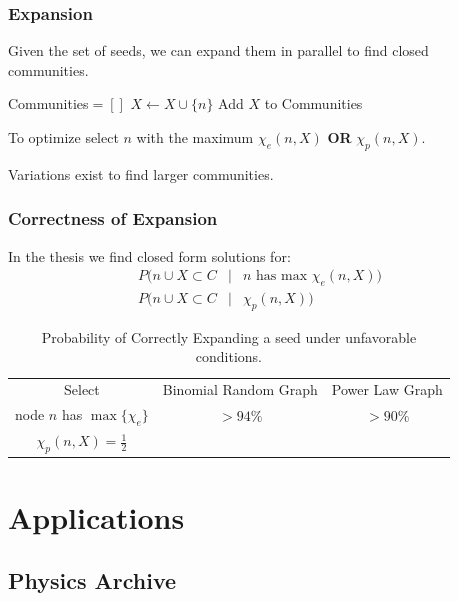\documentclass{beamer}
\begin{document}
\begin{frame}\frametitle{Expansion}

Given the set of seeds, we can expand them in parallel to find closed communities. \newline 

\begin{algorithmic}
	\STATE Communities$=[]$
			\STATE $X \leftarrow X \cup \{n\}$
		\ENDWHILE
	\STATE Add $X$ to Communities
	\ENDFOR
\end{algorithmic}
To optimize select $n$ with the maximum $\chi_e(n, X)$ {\bf OR} $\chi_p(n, X)$.

Variations exist to find larger communities.  

\end{frame}


\begin{frame}\frametitle{Correctness of Expansion}
In the thesis we find closed form solutions for:
\begin{eqnarray*}
 P(n \cup X \subset C &|& n \mbox{ has max } \chi_e(n, X)) \\
 P(n \cup X \subset C &|& \chi_p(n, X))
\end{eqnarray*}
\newline

\begin{table}[t]
\centering
\begin{tabular}{ccc}
Select & Binomial Random Graph & Power Law Graph \\
node $n$ has $\max \{\chi_e\}$ & $> 94 \%$&  $> 90 \%$ \\
$\chi_p(n, X) = \frac{1}{2}$ & & 
\end{tabular}
\caption{Probability of Correctly Expanding a seed under unfavorable conditions.}
\end{table}

\end{frame}



\section{Applications}

\subsection{Physics Archive}
\end{document}
